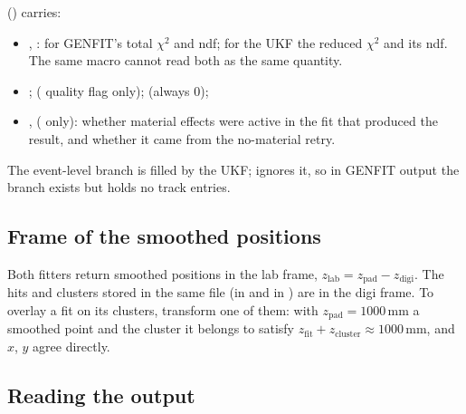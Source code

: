  () carries:
\begin{itemize}
\item {}, : for  GENFIT's total $\chi^2$ and ndf; for the UKF the
  reduced $\chi^2$ and its ndf. The same macro cannot read both as the same quantity.
\item {};  ( quality flag only);
   (always 0);
\item {},  ( only): whether material effects were
  active in the fit that produced the result, and whether it came from the no-material retry.
\end{itemize}
The event-level  branch is filled by the UKF;  ignores it, so in GENFIT output the
branch exists but holds no track entries.

\subsection{Frame of the smoothed positions}

Both fitters return smoothed positions in the lab frame, $z_\mathrm{lab} = z_\mathrm{pad} - z_\mathrm{digi}$. The hits
and clusters stored in the same file (in  and in ) are in
the digi frame. To overlay a fit on its clusters, transform one of them: with $z_\mathrm{pad}=1000$\,mm a smoothed point
and the cluster it belongs to satisfy $z_\mathrm{fit} + z_\mathrm{cluster} \approx 1000$\,mm, and $x$, $y$ agree
directly.

\subsection{Reading the output}

